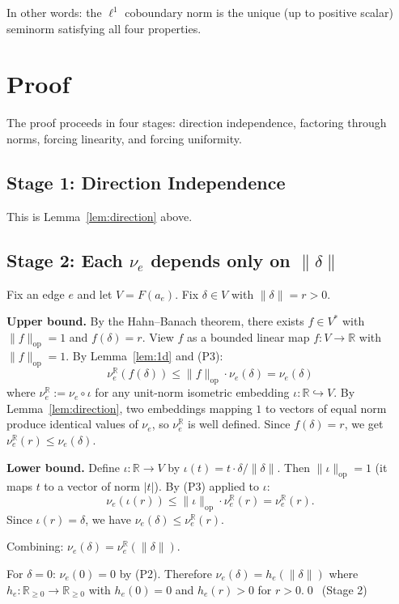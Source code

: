 \documentclass[11pt,a4paper]{amsart}
\theoremstyle{plain}
\theoremstyle{definition}
\DeclareMathOperator{\opnorm}{op}
\begin{document}
In other words: the $\ell^1$ coboundary norm is the unique (up to positive scalar) seminorm satisfying all four properties.

\section{Proof}

The proof proceeds in four stages: direction independence, factoring through norms, forcing linearity, and forcing uniformity.

\subsection*{Stage 1: Direction Independence}

This is Lemma~\ref{lem:direction} above.

\subsection*{Stage 2: Each $\nu_e$ depends only on $\|\delta\|$}

Fix an edge $e$ and let $V = F(a_e)$. Fix $\delta \in V$ with $\|\delta\| = r > 0$.

\medskip
\noindent\textbf{Upper bound.} By the Hahn--Banach theorem, there exists $f \in V^*$ with $\|f\|_{\opnorm} = 1$ and $f(\delta) = r$. View $f$ as a bounded linear map $f: V \to \mathbb{R}$ with $\|f\|_{\opnorm} = 1$. By Lemma~\ref{lem:1d} and (P3):
\[
\nu_e^{\mathbb{R}}(f(\delta)) \leq \|f\|_{\opnorm} \cdot \nu_e(\delta) = \nu_e(\delta)
\]
where $\nu_e^{\mathbb{R}} := \nu_e \circ \iota$ for any unit-norm isometric embedding $\iota: \mathbb{R} \hookrightarrow V$. By Lemma~\ref{lem:direction}, two embeddings mapping $1$ to vectors of equal norm produce identical values of $\nu_e$, so $\nu_e^{\mathbb{R}}$ is well defined. Since $f(\delta) = r$, we get $\nu_e^{\mathbb{R}}(r) \leq \nu_e(\delta)$.

\medskip
\noindent\textbf{Lower bound.} Define $\iota: \mathbb{R} \to V$ by $\iota(t) = t \cdot \delta / \|\delta\|$. Then $\|\iota\|_{\opnorm} = 1$ (it maps $t$ to a vector of norm $|t|$). By (P3) applied to $\iota$:
\[
\nu_e(\iota(r)) \leq \|\iota\|_{\opnorm} \cdot \nu_e^{\mathbb{R}}(r) = \nu_e^{\mathbb{R}}(r).
\]
Since $\iota(r) = \delta$, we have $\nu_e(\delta) \leq \nu_e^{\mathbb{R}}(r)$.

\medskip
Combining: $\nu_e(\delta) = \nu_e^{\mathbb{R}}(\|\delta\|)$.

For $\delta = 0$: $\nu_e(0) = 0$ by (P2). Therefore $\nu_e(\delta) = h_e(\|\delta\|)$ where $h_e: \mathbb{R}_{\geq 0} \to \mathbb{R}_{\geq 0}$ with $h_e(0) = 0$ and $h_e(r) > 0$ for $r > 0$.\qed\ (Stage 2)
\end{document}
